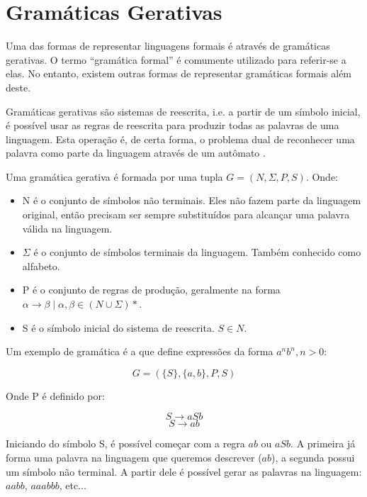 \documentclass[a4paper,12pt,oneside,onecolumn]{uerj}
\begin{document}
\section{Gramáticas Gerativas}

Uma das formas de representar linguagens formais é através de gramáticas gerativas. O termo ``gramática formal'' é comumente utilizado para referir-se a elas. No entanto, existem outras formas de representar gramáticas formais além deste.

Gramáticas gerativas são sistemas de reescrita, i.e. a partir de um símbolo inicial, é possível usar as regras de reescrita para produzir todas as palavras de uma linguagem. Esta operação é, de certa forma, o problema dual de reconhecer uma palavra como parte da linguagem através de um autômato \cite{bib:Ruohonen09}.

Uma gramática gerativa é formada por uma tupla $G = (N, \Sigma, P, S)$. Onde:

\begin{itemize}
    \item N é o conjunto de símbolos não terminais. Eles não fazem parte da linguagem original, então precisam ser sempre substituídos para alcançar uma palavra válida na linguagem.
    \item $\Sigma$ é o conjunto de símbolos terminais da linguagem. Também conhecido como alfabeto.
    \item P é o conjunto de regras de produção, geralmente na forma $\alpha \rightarrow \beta \mid \alpha, \beta \in (N \cup \Sigma)*$.
    \item S é o símbolo inicial do sistema de reescrita. $S \in N$.
\end{itemize}

Um exemplo de gramática é a que define expressões da forma $a^nb^n, n>0$:

\begin{equation*}
	G = ({\{S\}, \{a,b\}, P, S})
\end{equation*}

Onde P é definido por:

\begin{equation*}
	S \rightarrow aSb
\end{equation*}
\begin{equation*}
	S \rightarrow ab
\end{equation*}

Iniciando do símbolo S, é possível começar com a regra $ab$ ou $aSb$. A primeira já forma uma palavra na linguagem que queremos descrever ($ab$), a segunda possui um símbolo não terminal. A partir dele é possível gerar as palavras na linguagem: $aabb$, $aaabbb$, etc...
\end{document}
